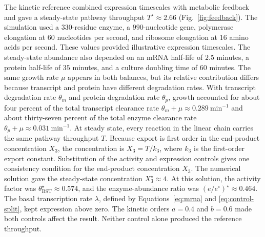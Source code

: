 The kinetic reference combined expression timescales with metabolic feedback
and gave a steady-state pathway throughput $T^{\star}\approx2.66$
(Fig.~\ref{fig:feedback}). The simulation used a $330$-residue enzyme, a
$990$-nucleotide gene, polymerase elongation at $60$ nucleotides per second,
and ribosome elongation at $16$ amino acids per second. These values provided
illustrative expression timescales. The steady-state abundance also depended on an mRNA half-life of
$2.5$ minutes, a protein half-life of $35$ minutes, and a culture doubling
time of $60$ minutes. The same growth rate $\mu$ appears in both balances,
but its relative contribution differs because transcript and protein have
different degradation rates. With transcript degradation rate $\theta_m$ and
protein degradation rate $\theta_p$, growth accounted for about four percent
of the total transcript clearance rate
$\theta_m+\mu\approx0.289~\mathrm{min}^{-1}$ and about thirty-seven percent
of the total enzyme clearance rate
$\theta_p+\mu\approx0.031~\mathrm{min}^{-1}$. At steady state, every reaction
in the linear chain carries the same pathway throughput $T$. Because export
is first order in the end-product concentration $X_3$, the concentration is
$X_3=T/k_3$, where $k_3$ is the first-order export constant. Substitution of
the activity and expression controls gives one consistency condition for the
end-product concentration $X_3$. The numerical solution gave the steady-state
concentration $X_3^{\star}\approx4$. At this solution, the activity factor was
$\theta_{\mathrm{BST}}^{\star}\approx0.574$, and the enzyme-abundance ratio was
$(e/e^{\circ})^{\star}\approx0.464$. The basal transcription rate
$\lambda$, defined by Equations~\eqref{eq:mrna} and
\eqref{eq:control-split}, kept expression above zero. The kinetic orders
$a=0.4$ and $b=0.6$ made both controls affect the result. Neither control alone
produced the reference throughput.


